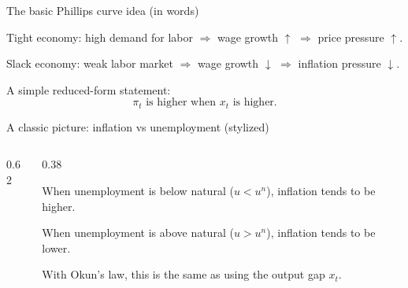 \documentclass[aspectratio=169,xcolor=dvipsnames]{beamer}
\let\tempone\itemize
\let\temptwo\enditemize
\renewenvironment{itemize}{\tempone\addtolength{\itemsep}{\fill}}{\temptwo}
\begin{document}
\begin{frame}{The basic Phillips curve idea (in words)}
\begin{itemize}
\item Tight economy: high demand for labor $\Rightarrow$ wage growth $\uparrow$ $\Rightarrow$ price pressure $\uparrow$.
\item Slack economy: weak labor market $\Rightarrow$ wage growth $\downarrow$ $\Rightarrow$ inflation pressure $\downarrow$.
\end{itemize}

\begin{itemize}
\item A simple reduced-form statement:
\[
\pi_t \text{ is higher when } x_t \text{ is higher.}
\]
\end{itemize}
\end{frame}

\begin{frame}{A classic picture: inflation vs unemployment (stylized)}
\begin{columns}
\begin{column}{0.62\textwidth}
\centering
{}
\end{column}
\begin{column}{0.38\textwidth}
\small
\begin{itemize}
\item When unemployment is below natural ($u<u^n$), inflation tends to be higher.
\item When unemployment is above natural ($u>u^n$), inflation tends to be lower.
\item With Okun’s law, this is the same as using the output gap $x_t$.
\end{itemize}
\end{column}
\end{columns}
\end{frame}
\end{document}
